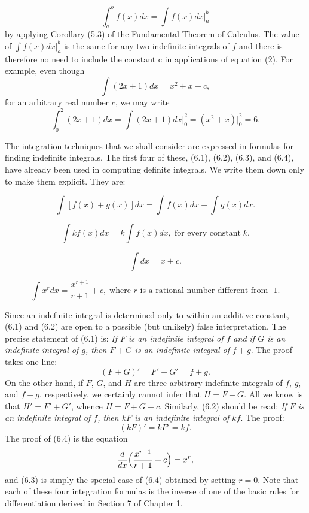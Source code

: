 \begin{equation}
\int_{a}^{b} f(x) dx = \int f(x) dx \Big|_{a}^{b}
\label{eq4.6.2}
\end{equation}
\noindent by applying Corollary (5.3) of the Fundamental Theorem of Calculus. The value of $\int f(x)dx|_{a}^{b}$ is the same for any two indefinite integrals of $f$ and there is therefore no need to include the constant c in applications of equation (2). For example, even though
$$
\int (2x + 1) dx = x^2 + x + c,
$$
\noindent for an arbitrary real number $c$, we may write
$$
\int_{0}^{2} (2x + 1 ) dx = \int (2x + 1 ) dx \Big|_{0}^{2} 
= (x^2 + x) \Big|_{0}^{2} = 6.
$$

The integration techniques that we shall consider are expressed in formulas for finding indefinite integrals. The first four of these, (6.1), (6.2), (6.3), and (6.4), have already been used in computing definite integrals. We
write them down only to make them explicit. They are:

\begin{theorem} %
$$\int [f(x) + g(x)]dx = \int f(x)dx + \int g(x)dx.$$
\end{theorem}

\begin{theorem} %
$$
\int kf(x) dx = k \int f(x) dx, \;\mbox{for every constant}\; k. 
$$
\end{theorem}

\begin{theorem} %
$$\int dx = x + c. $$ 
\end{theorem}

\begin{theorem} %
$$
\int x^r dx =  \frac{x^{r + 1}}{r + 1} + c, \;\mbox{where $r$ is a rational number different from -1.}
$$
\end{theorem}

Since an indefinite integral is determined only to within an additive constant, (6.1) and (6.2) are open to a possible (but unlikely) false interpretation. The precise statement of (6.1) is: \textit{If $F$ is an indefinite integral of $f$ and if $G$ is an indefinite integral of $g$, then $F + G$ is an indefinite integral of $f + g$}. The proof takes one line:
$$
(F+ G)' = F' + G' = f + g.
$$
\noindent On the other hand, if $F$, $G$, and $H$ are three arbitrary indefinite integrals of $f$, $g$, and $f + g$, respectively, we certainly cannot infer that $H = F + G$. All we know is that $H' = F' + G'$, whence $H = F + G + c$. Similarly, (6.2) should be read: \textit{If $F$ is an indefinite integral of $f$, then $kF$ is an indefinite integral of $kf$}. The proof:
$$
(kF)' = kF' = kf.
$$
\noindent The proof of (6.4) is the equation
$$
\frac{d}{dx} \Bigl( \frac{x^{r + 1}}{r + 1} + c \Bigr) = x^r,
$$
\noindent and (6.3) is simply the special case of (6.4) obtained by setting $r = 0$. Note that each of these four integration formulas is the inverse of one of the basic rules for differentiation derived in Section 7 of Chapter 1. 
\medskip

